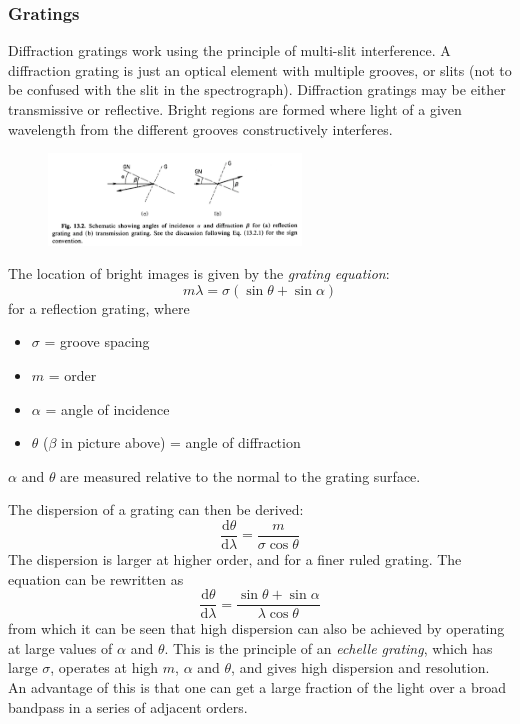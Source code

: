 \documentclass[12pt]{article}
\begin{document}
\subsubsection{Gratings} Diffraction gratings work using the principle of
multi-slit interference. A diffraction grating is just an optical element with
multiple grooves, or slits (not to be confused with the slit in the
spectrograph). Diffraction gratings may be either transmissive or reflective.
Bright regions are formed where light of a given wavelength from the different
grooves constructively interferes.
\begin{figure}[ht]
    \centering
    \includegraphics[width=0.6\textwidth]{angle.png}
\end{figure}
The location of bright images is given by the
\textit{grating equation}:
{$$
    m\lambda = \sigma\left(\sin\theta + \sin\alpha\right)
$$}
for a reflection grating, where
\begin{itemize}
    \item $\sigma$ = groove spacing
    \item $m$ = order
    \item $\alpha$ = angle of incidence
    \item $\theta$ ($\beta$ in picture above) = angle of diffraction
\end{itemize}
$\alpha$ and $\theta$ are measured relative to the normal to the grating surface.

The dispersion of a grating can then be derived:
{$$
    \frac{\mathrm{d}\theta}{\mathrm{d}\lambda} =
    \frac{m}{\sigma\cos\theta}
$$}
The dispersion is larger at higher order, and for a
finer ruled grating. The equation can be rewritten as
{$$
    \frac{\mathrm{d}\theta}{\mathrm{d}\lambda} =
    \frac{\sin\theta + \sin\alpha}{\lambda\cos\theta}
$$}
from which it can be seen that high dispersion can also be achieved by
operating at large values of $\alpha$ and $\theta$. This is the principle of an
\textit{echelle grating}, which has large $\sigma$, operates at high $m$,
$\alpha$ and $\theta$, and gives high dispersion and resolution. An advantage
of this is that one can get a large fraction of the light over a broad bandpass
in a series of adjacent orders.
\end{document}
